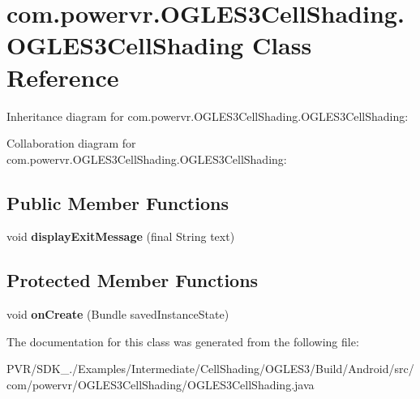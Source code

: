 \hypertarget{classcom_1_1powervr_1_1_o_g_l_e_s3_cell_shading_1_1_o_g_l_e_s3_cell_shading}{\section{com.\+powervr.\+O\+G\+L\+E\+S3\+Cell\+Shading.\+O\+G\+L\+E\+S3\+Cell\+Shading Class Reference}
\label{classcom_1_1powervr_1_1_o_g_l_e_s3_cell_shading_1_1_o_g_l_e_s3_cell_shading}
}


Inheritance diagram for com.\+powervr.\+O\+G\+L\+E\+S3\+Cell\+Shading.\+O\+G\+L\+E\+S3\+Cell\+Shading\+:


Collaboration diagram for com.\+powervr.\+O\+G\+L\+E\+S3\+Cell\+Shading.\+O\+G\+L\+E\+S3\+Cell\+Shading\+:
\subsection*{Public Member Functions}
\begin{DoxyCompactItemize}
\item 
\hypertarget{classcom_1_1powervr_1_1_o_g_l_e_s3_cell_shading_1_1_o_g_l_e_s3_cell_shading_a5a89857f838f63effd664bd17725e319}{void {\bfseries display\+Exit\+Message} (final String text)}\label{classcom_1_1powervr_1_1_o_g_l_e_s3_cell_shading_1_1_o_g_l_e_s3_cell_shading_a5a89857f838f63effd664bd17725e319}

\end{DoxyCompactItemize}
\subsection*{Protected Member Functions}
\begin{DoxyCompactItemize}
\item 
\hypertarget{classcom_1_1powervr_1_1_o_g_l_e_s3_cell_shading_1_1_o_g_l_e_s3_cell_shading_aa7c661be447e8fe8fb6256c5b00f9789}{void {\bfseries on\+Create} (Bundle saved\+Instance\+State)}\label{classcom_1_1powervr_1_1_o_g_l_e_s3_cell_shading_1_1_o_g_l_e_s3_cell_shading_aa7c661be447e8fe8fb6256c5b00f9789}

\end{DoxyCompactItemize}


The documentation for this class was generated from the following file\+:\begin{DoxyCompactItemize}
\item 
P\+V\+R/\+S\+D\+K\+\_./\+Examples/\+Intermediate/\+Cell\+Shading/\+O\+G\+L\+E\+S3/\+Build/\+Android/src/com/powervr/\+O\+G\+L\+E\+S3\+Cell\+Shading/O\+G\+L\+E\+S3\+Cell\+Shading.\+java\end{DoxyCompactItemize}
